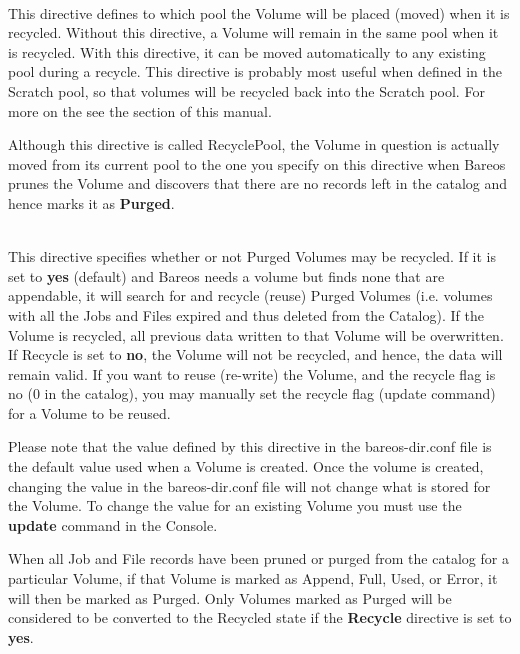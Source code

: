 \begin{description}
\label{PoolRecyclePool}
\item [RecyclePool = {\textless}pool-resource-name{\textgreater}] \hfill \\
This directive defines to which pool
the Volume will be placed (moved) when it is recycled. Without
this directive, a Volume will remain in the same pool when it is
recycled. With this directive, it can be moved automatically to any
existing pool during a recycle. This directive is probably most
useful when defined in the Scratch pool, so that volumes will
be recycled back into the Scratch pool. For more on the see the
 section of this manual.

Although this directive is called RecyclePool, the Volume in
question is actually moved from its current pool to the one
you specify on this directive when Bareos prunes the Volume and
discovers that there are no records left in the catalog and hence
marks it as {\bf Purged}.

\label{PoolRecycle}
\item [Recycle = {\textless}yes{\textbar}no{\textgreater}] \hfill \\
This directive specifies whether or not Purged Volumes may be recycled.
If it is set to {\bf yes} (default) and Bareos needs a volume but finds
none that are appendable, it will search for and recycle (reuse) Purged
Volumes (i.e.  volumes with all the Jobs and Files expired and thus
deleted from the Catalog).  If the Volume is recycled, all previous data
written to that Volume will be overwritten. If Recycle is set to {\bf
no}, the Volume will not be recycled, and hence, the data will remain
valid.  If you want to reuse (re-write) the Volume, and the recycle flag
is no (0 in the catalog), you may manually set the recycle flag (update
command) for a Volume to be reused.

Please note that the value defined by this directive in the
bareos-dir.conf file is the default value used when a Volume is created.
Once the volume is created, changing the value in the bareos-dir.conf
file will not change what is stored for the Volume.  To change the value
for an existing Volume you must use the {\bf update} command in the
Console.

When all Job and File records have been pruned or purged from the
catalog for a particular Volume, if that Volume is marked as
Append, Full, Used, or Error, it will then be marked as Purged. Only
Volumes marked as Purged will be considered to be converted to the
Recycled state if the {\bf Recycle} directive is set to {\bf yes}.


\end{description}
